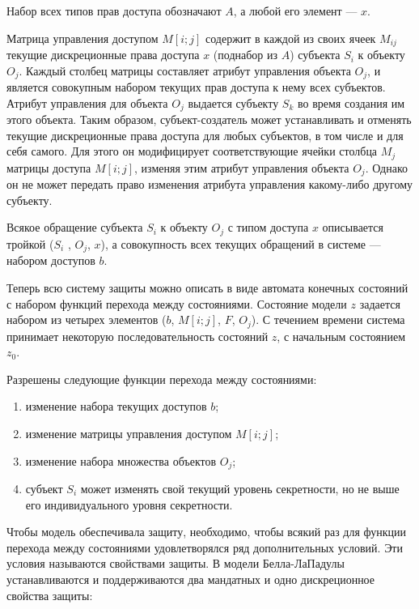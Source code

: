 Набор всех типов прав доступа обозначают $A$, а любой его элемент --- $x$.

Матрица управления доступом $M[i;j]$ содержит в каждой из своих ячеек $M_{ij}$ текущие дискреционные права доступа $x$ (поднабор из $A$) субъекта $S_i$ к объекту $O_j$. Каждый столбец матрицы составляет атрибут управления объекта $O_j$, и является совокупным набором текущих прав доступа к нему всех субъектов. Атрибут управления для объекта $O_j$ выдается субъекту $S_k$ во время создания им этого объекта. Таким образом, субъект-создатель может устанавливать и отменять текущие дискреционные права доступа для любых субъектов, в том числе и для себя самого. Для этого он модифицирует соответствующие ячейки столбца $M_j$ матрицы доступа $M[i;j]$, изменяя этим атрибут управления объекта $O_j$. Однако он не может передать право изменения атрибута управления какому-либо другому субъекту.

Всякое обращение субъекта $S_i$ к объекту $O_j$ с типом доступа $x$ описывается тройкой ($S_i$ , $O_j$, $x$), а совокупность всех текущих обращений в системе --- набором доступов $b$.

Теперь всю систему защиты можно описать в виде автомата конечных состояний с набором функций перехода между состояниями. Состояние модели $z$ задается набором из четырех элементов ($b$, $M[i;j]$, $F$,  $O_j$). С течением времени система принимает некоторую последовательность состояний $z$, с начальным состоянием $z_0$.

Разрешены следующие функции перехода между состояниями:

\begin{enumerate}
	\item изменение набора текущих доступов $b$;
	\item изменение матрицы управления доступом $M[i;j]$;
	\item изменение набора множества объектов $O_j$;
	\item субъект $S_i$ может изменять свой текущий уровень секретности, но не выше его индивидуального уровня секретности.
\end{enumerate}

Чтобы модель обеспечивала защиту, необходимо, чтобы всякий раз для функции перехода между состояниями удовлетворялся ряд дополнительных условий. Эти условия называются свойствами защиты. В модели Белла-ЛаПадулы устанавливаются и поддерживаются два мандатных и одно дискреционное свойства защиты\footnotemark:


